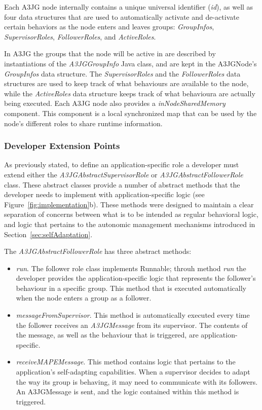 Each A3JG node internally contains a unique universal identifier (\emph{id}), as well as four data structures that are used to automatically activate and de-activate certain behaviors as the node enters and leaves groups: \emph{GroupInfos}, \emph{SupervisorRoles}, \emph{FollowerRoles}, and \emph{ActiveRoles}. 

In A3JG the groups that the node will be active in are described by instantiations of the \emph{A3JGGroupInfo} Java class, and are kept in the A3JGNode's \emph{GroupInfos} data structure.  The \emph{SupervisorRoles} and the \emph{FollowerRoles} data structures are used to keep track of what behaviours are available to the node, while the \emph{ActiveRoles} data structure keeps track of what behavioura are actually being executed. Each A3JG node also provides a \emph{inNodeSharedMemory} component. This component is a local synchronized map that can be used by the node's different roles to share runtime information.


\subsubsection{Developer Extension Points} %
\label{subsub:developer_extension_points}

As previously stated, to define an application-specific role a developer must extend either the \emph{A3JGAbstractSupervisorRole} or \emph{A3JGAbstractFollowerRole} class. These abstract classes provide a number of abstract methods that the developer needs to implement with application-specific logic (see Figure~\ref{fig:implementation}b). These methods were designed to maintain a clear separation of concerns between what is to be intended as regular behavioral logic, and logic that pertains to the autonomic management mechanisms introduced in Section~\ref{sec:selfAdaptation}.

The \emph{A3JGAbstractFollowerRole} has three abstract methods:

\begin{itemize}
	\item \emph{run}. The follower role class implements Runnable; throuh method \emph{run} the developer provides the application-specific logic that represents the follower's behaviour in a specific group. This method that is executed automatically when the node enters a group as a follower.
	\item \emph{messageFromSupervisor}. This method is automatically executed every time the follower receives an \emph{A3JGMessage} from its supervisor. The contents of the message, as well as the behaviour that is triggered, are application-specific.
	\item \emph{receiveMAPEMessage}. This method contains logic that pertains to the application's self-adapting capabilities. When a supervisor decides to adapt the way its group is behaving, it may need to communicate with its followers. An A3JGMessage is sent, and the logic contained within this method is triggered.
\end{itemize}

